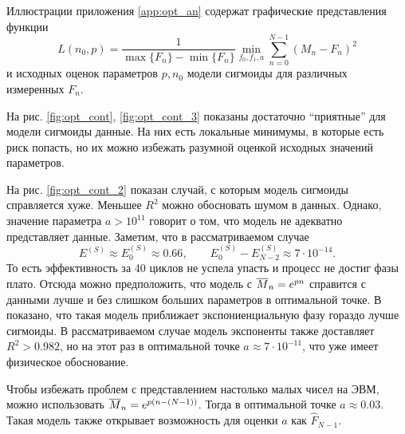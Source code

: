 Иллюстрации приложения \ref{app:opt_an} содержат графические представления
функции
\begin{equation}\label{eq:opt_fun}
  L(n_0,p)=\frac{1}{\max\{F_{n}\}-\min\{F_{n}\}}\min_{f_0,f_1,a}
  \sum_{n=0}^{N-1}(M_{n}-F_{n})^{2}
\end{equation}
и исходных оценок параметров $p,n_0$ модели сигмоиды для различных измеренных
$F_{n}$.

На рис. \ref{fig:opt_cont}, \ref{fig:opt_cont_3} показаны достаточно
\enquote{приятные} для модели сигмоиды данные. На них есть локальные минимумы,
в которые есть риск попасть, но их можно избежать разумной оценкой исходных
значений параметров.

На рис. \ref{fig:opt_cont_2} показан случай, с которым модель сигмоиды
справляется хуже. Меньшее $R^{2}$ можно обосновать шумом в данных. Однако,
значение параметра $a>10^{11}$ говорит о том, что модель не адекватно
представляет данные. Заметим, что в рассматриваемом случае
\[
  E^{(S)}\approx E^{(S)}_0\approx 0.66,\qquad
  E^{(S)}_{0}-E^{(S)}_{N-2}\approx 7\cdot 10^{-14}.
\]
То есть эффективность за 40 циклов не успела упасть и процесс не достиг фазы
плато. Отсюда можно предположить, что модель с $\overline{M}_{n}=e^{pn}$ справится с
данными лучше и без слишком больших параметров в оптимальной точке. В
\cite{zhaoComprehensiveAlgorithmQuantitative2005} показано, что такая модель
приближает экспониенциальную фазу гораздо лучше сигмоиды. В рассматриваемом
случае модель экспоненты также доставляет $R^{2}>0.982$, но на этот раз в
оптимальной точке $a\approx 7\cdot 10^{-11}$, что уже имеет физическое
обоснование.

Чтобы избежать проблем с представлением настолько малых чисел на ЭВМ, можно
использовать $\overline{M}_{n}=e^{p(n-(N-1))}$. Тогда в оптимальной точке
$a\approx 0.03$. Такая модель также открывает возможность для оценки $a$ как
$\hat F_{N-1}$.

